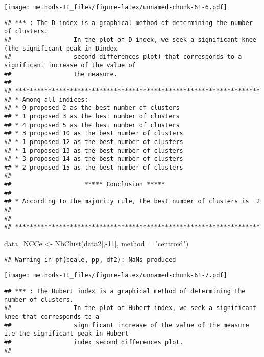 \documentclass[
]{article}
\newenvironment{Shaded}{\begin{snugshade}}{\end{snugshade}}
\newcommand{\AttributeTok}[1]{\textcolor[rgb]{0.77,0.63,0.00}{#1}}
\newcommand{\DecValTok}[1]{\textcolor[rgb]{0.00,0.00,0.81}{#1}}
\newcommand{\FunctionTok}[1]{\textcolor[rgb]{0.00,0.00,0.00}{#1}}
\newcommand{\NormalTok}[1]{#1}
\newcommand{\OtherTok}[1]{\textcolor[rgb]{0.56,0.35,0.01}{#1}}
\newcommand{\SpecialCharTok}[1]{\textcolor[rgb]{0.00,0.00,0.00}{#1}}
\newcommand{\StringTok}[1]{\textcolor[rgb]{0.31,0.60,0.02}{#1}}
\begin{document}
\texttt{[image: methods-II\_files/figure-latex/unnamed-chunk-61-6.pdf]}

\begin{verbatim}
## *** : The D index is a graphical method of determining the number of clusters. 
##                 In the plot of D index, we seek a significant knee (the significant peak in Dindex
##                 second differences plot) that corresponds to a significant increase of the value of
##                 the measure. 
##  
## ******************************************************************* 
## * Among all indices:                                                
## * 9 proposed 2 as the best number of clusters 
## * 1 proposed 3 as the best number of clusters 
## * 4 proposed 5 as the best number of clusters 
## * 3 proposed 10 as the best number of clusters 
## * 1 proposed 12 as the best number of clusters 
## * 1 proposed 13 as the best number of clusters 
## * 3 proposed 14 as the best number of clusters 
## * 2 proposed 15 as the best number of clusters 
## 
##                    ***** Conclusion *****                            
##  
## * According to the majority rule, the best number of clusters is  2 
##  
##  
## *******************************************************************
\end{verbatim}

\begin{Shaded}
\begin{Highlighting}[]
\NormalTok{data\_NCCe }\OtherTok{\textless{}{-}} \FunctionTok{NbClust}\NormalTok{(data2[,}\SpecialCharTok{{-}}\DecValTok{11}\NormalTok{], }\AttributeTok{method =} \StringTok{"centroid"}\NormalTok{)}
\end{Highlighting}
\end{Shaded}

\begin{verbatim}
## Warning in pf(beale, pp, df2): NaNs produced
\end{verbatim}

\texttt{[image: methods-II\_files/figure-latex/unnamed-chunk-61-7.pdf]}

\begin{verbatim}
## *** : The Hubert index is a graphical method of determining the number of clusters.
##                 In the plot of Hubert index, we seek a significant knee that corresponds to a 
##                 significant increase of the value of the measure i.e the significant peak in Hubert
##                 index second differences plot. 
## 
\end{verbatim}
\end{document}

